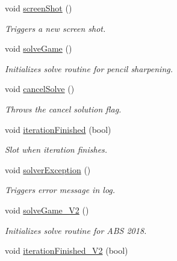 \begin{DoxyCompactItemize}
void \hyperlink{classSGMainWindow_aed927310137a02965872acf8c653f39f}{screen\+Shot} ()
\begin{DoxyCompactList}\small\item\em Triggers a new screen shot. \end{DoxyCompactList}\item 
\mbox{\label{classSGMainWindow_a35df4b379f8ee46e78771c8190188e5a}} 
void \hyperlink{classSGMainWindow_a35df4b379f8ee46e78771c8190188e5a}{solve\+Game} ()
\begin{DoxyCompactList}\small\item\em Initializes solve routine for pencil sharpening. \end{DoxyCompactList}\item 
\mbox{\label{classSGMainWindow_aee37774a08e1d24544ab028d181192eb}} 
void \hyperlink{classSGMainWindow_aee37774a08e1d24544ab028d181192eb}{cancel\+Solve} ()
\begin{DoxyCompactList}\small\item\em Throws the cancel solution flag. \end{DoxyCompactList}\item 
void \hyperlink{classSGMainWindow_a511aee91c2c031f7f4a9148073177f0e}{iteration\+Finished} (bool)
\begin{DoxyCompactList}\small\item\em Slot when iteration finishes. \end{DoxyCompactList}\item 
void \hyperlink{classSGMainWindow_aa7cb5fa0763b2914492fc518dd175019}{solver\+Exception} ()
\begin{DoxyCompactList}\small\item\em Triggers error message in log. \end{DoxyCompactList}\item 
\mbox{\label{classSGMainWindow_ad03acb0ec39c884ca93102c6c23743b5}} 
void \hyperlink{classSGMainWindow_ad03acb0ec39c884ca93102c6c23743b5}{solve\+Game\+\_\+\+V2} ()
\begin{DoxyCompactList}\small\item\em Initializes solve routine for A\+BS 2018. \end{DoxyCompactList}\item 
void \hyperlink{classSGMainWindow_a59248c811344a260981ea270d86d5d19}{iteration\+Finished\+\_\+\+V2} (bool)

\end{DoxyCompactItemize}
